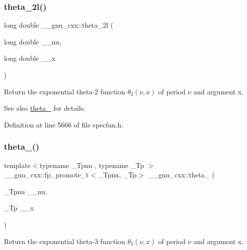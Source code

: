 \subsubsection{\texorpdfstring{theta\+\_\+2l()}{theta\_2l()}}
{\footnotesize\ttfamily long double \+\_\+\+\_\+gnu\+\_\+cxx\+::theta\+\_\+2l (\begin{DoxyParamCaption}\item[{long double}]{\+\_\+\+\_\+nu,  }\item[{long double}]{\+\_\+\+\_\+x }\end{DoxyParamCaption})\hspace{0.3cm}{\ttfamily [inline]}}

Return the exponential theta-\/2 function $ \theta_2(\nu,x) $ of period $ \nu $ and argument {\ttfamily x}.

\begin{DoxySeeAlso}{See also}
\hyperlink{group__mathsf__gnu_ga16f278edeb2842d614bae1f1ae2d0256}{theta\+\_} for details. 
\end{DoxySeeAlso}


Definition at line 5666 of file specfun.\+h.

\mbox{\label{group__mathsf__gnu_ga146c3b8e86991e164d4bf143cda5f0fc}} 
\subsubsection{\texorpdfstring{theta\+\_()}{theta\_3()}}
{\footnotesize\ttfamily template$<$typename \+\_\+\+Tpnu , typename \+\_\+\+Tp $>$ \\
\+\_\+\+\_\+gnu\+\_\+cxx\+::fp\+\_\+promote\+\_\+t$<$\+\_\+\+Tpnu, \+\_\+\+Tp$>$ \+\_\+\+\_\+gnu\+\_\+cxx\+::theta\+\_ (\begin{DoxyParamCaption}\item[{\+\_\+\+Tpnu}]{\+\_\+\+\_\+nu,  }\item[{\+\_\+\+Tp}]{\+\_\+\+\_\+x }\end{DoxyParamCaption})\hspace{0.3cm}{\ttfamily [inline]}}

Return the exponential theta-\/3 function $ \theta_3(\nu,x) $ of period $ \nu $ and argument {\ttfamily x}.

